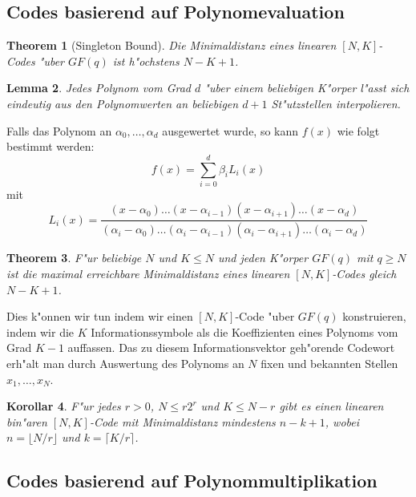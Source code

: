\documentclass[german, 10pt, a4paper, twocolumn]{scrartcl}
\newtheorem{theorem}{Theorem}
\newtheorem{lemma}[theorem]{Lemma}
\newtheorem{korollar}[theorem]{Korollar}
\begin{document}
\subsection{Codes basierend auf Polynomevaluation}

\begin{theorem}[Singleton Bound]
	Die Minimaldistanz eines linearen $[N,K]$-Codes "uber $GF(q)$ ist h"ochstens $N-K+1$.
\end{theorem}

\begin{lemma}
	Jedes Polynom vom Grad $d$ "uber einem beliebigen K"orper l"asst sich eindeutig aus den Polynomwerten an beliebigen $d+1$ St"utzstellen interpolieren.
\end{lemma}

Falls das Polynom an $\alpha_0,\ldots,\alpha_d$ ausgewertet wurde, so kann $f(x)$ wie folgt bestimmt werden:
\begin{displaymath}
	f(x) = \sum^d_{i=0} \beta_i L_i(x)
\end{displaymath}
mit
\begin{displaymath}
	L_i(x) = \frac{(x-\alpha_0)\ldots(x-\alpha_{i-1})(x-\alpha_{i+1})\ldots(x-\alpha_d)}{(\alpha_i-\alpha_0)\ldots(\alpha_i -\alpha_{i-1})(\alpha_i-\alpha_{i+1})\ldots(\alpha_i-\alpha_d)}
\end{displaymath}

\begin{theorem}
	F"ur beliebige $N$ und $K \leq N$ und jeden K"orper $GF(q)$ mit $q\geq N$ ist die maximal erreichbare Minimaldistanz eines linearen $[N,K]$-Codes gleich $N-K+1$.
\end{theorem}

Dies k"onnen wir tun indem wir einen $[N,K]$-Code "uber $GF(q)$ konstruieren, indem wir die $K$ Informationssymbole als die Koeffizienten eines Polynoms vom Grad $K-1$ auffassen. Das zu diesem Informationsvektor geh"orende Codewort erh"alt man durch Auswertung des Polynoms an $N$ fixen und bekannten Stellen $x_1,\ldots,x_N$.

\begin{korollar}
	F"ur jedes $r > 0$, $N \leq r2^r$ und $K \leq N -r$ gibt es einen linearen bin"aren $[N,K]$-Code mit Minimaldistanz mindestens $n-k+1$, wobei $n=\lfloor N/r \rfloor$ und $k = \lceil K/r \rceil$.
\end{korollar}

\subsection{Codes basierend auf Polynommultiplikation}
\end{document}
